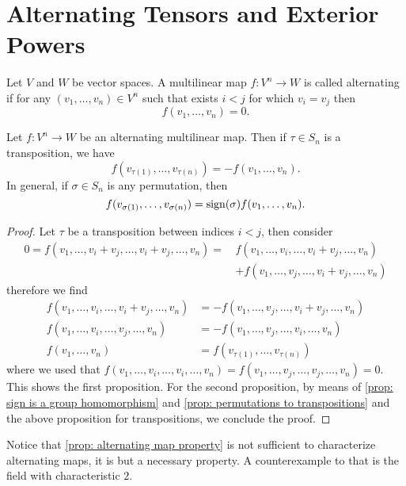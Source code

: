 \section{Alternating Tensors and Exterior Powers}

\begin{definition}
\label{def: alternating map}
Let \(V\) and \(W\) be vector spaces. A multilinear map \(f: V^n \to W\) is
called alternating if for any \((v_1, \dots, v_n) \in V^n\) such that exists \(i
< j\) for which \(v_i = v_j\) then
\[
  f(v_1, \dots, v_n) = 0.
\]
\end{definition}

\begin{proposition}\label{prop: alternating map property}
Let \(f: V^n \to W\) be an alternating multilinear map. Then if \(\tau \in
S_n\) is a transposition, we have
\[
  f(v_{\tau(1)}, \dots, v_{\tau(n)}) = - f(v_1, \dots, v_n).
\]
In general, if \(\sigma \in S_n\) is any permutation, then
\[
  f(v_{\sigma(1)}, \dots, v_{\sigma(n)}) = \operatorname{sign}(\sigma) f(v_1,
  \dots, v_n).
\]
\end{proposition}

\begin{proof}
Let \(\tau\) be a transposition between indices \(i < j\), then consider
\begin{align*}
  0 = f(v_1, \dots, v_i + v_j, \dots, v_i + v_j, \dots, v_n)
  =\, & f(v_1, \dots, v_i, \dots, v_i + v_j, \dots, v_n) \\
    & + f(v_1, \dots, v_j, \dots, v_i + v_j, \dots, v_n)
\end{align*}
therefore we find
\begin{align*}
  f(v_1, \dots, v_i, \dots, v_i + v_j, \dots, v_n)
  &= - f(v_1, \dots, v_j, \dots, v_i + v_j, \dots, v_n) \\
  f(v_1, \dots, v_i, \dots, v_j, \dots, v_n)
  &= - f(v_1, \dots, v_j, \dots, v_i, \dots, v_n) \\
  f(v_1, \dots, v_n)
  &= f(v_{\tau(1)}, \dots, v_{\tau(n)})
\end{align*}
where we used that \(f(v_1, \dots, v_i, \dots, v_i, \dots, v_n) = f(v_1,
\dots, v_j, \dots, v_j, \dots, v_n) = 0\). This shows the first proposition.
For the second proposition, by means of \cref{prop: sign is a group
homomorphism} and \cref{prop: permutations to transpositions} and the above
proposition for transpositions, we conclude the proof.
\end{proof}

\begin{remark}
Notice that \cref{prop: alternating map property} is not sufficient to
characterize alternating maps, it is but a necessary property. A
counterexample to that is the field with characteristic \(2\).
\end{remark}

